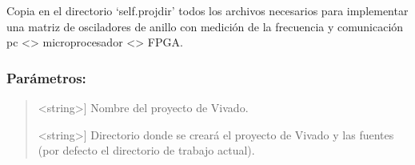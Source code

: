 \documentclass[letterpaper,10pt,english]{sphinxmanual}
\begin{document}
\begin{fulllineitems}
\begin{fulllineitems}
\end{fulllineitems}


\begin{fulllineitems}
\label{\detokenize{myfpga:myfpga.ring_osc.StdMatrix.implement}}
\pysigstartsignatures
{}
\pysigstopsignatures
\sphinxAtStartPar
Copia en el directorio ‘self.projdir’ todos los archivos necesarios para 
implementar una matriz de osciladores de anillo con medición de la 
frecuencia y comunicación pc \textless{}\sphinxhyphen{}\textgreater{} microprocesador \textless{}\sphinxhyphen{}\textgreater{} FPGA.


\subsubsection{Parámetros:}
\label{\detokenize{myfpga:id5}}\begin{quote}
\begin{description}
\sphinxlineitem{projname}{[}\textless{}string\textgreater{}{]}
\sphinxAtStartPar
Nombre del proyecto de Vivado.

\sphinxlineitem{projdir}{[}\textless{}string\textgreater{}{]}
\sphinxAtStartPar
Directorio donde se creará el proyecto de Vivado y las fuentes (por
defecto el directorio de trabajo actual).


\end{description}
\end{quote}
\end{fulllineitems}
\end{fulllineitems}
\end{document}
